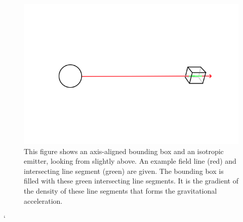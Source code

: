 \documentclass[12pt]{article}
\begin{document}
\begin{figure} 
\centering
\label{fig1}
  \includegraphics[width =5 in]{AABB.png}
  \caption{
This figure shows an axis-aligned bounding box and an isotropic emitter, looking from slightly above.
An example field line (red) and intersecting line segment (green) are given.
The bounding box is filled with these green intersecting line segments.
It is the gradient of the density of these line segments that forms the gravitational acceleration.
}
\end{figure}`
\end{document}
